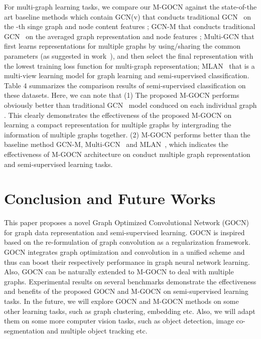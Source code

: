 \documentclass{article}
\begin{document}
For multi-graph learning tasks, we compare our M-GOCN against the state-of-the art baseline methods which contain
{GCN(v)} that conducts traditional GCN~\cite{kipf2016semi} on the -th singe graph  and node content features ;
{GCN-M} that conducts traditional GCN~\cite{kipf2016semi} on the averaged graph representation  and node features ;
{Multi-GCN} that first learns representations for multiple graphs  by using/sharing the common parameters (as suggested in work~\cite{duvenaud2015convolutional}), and then select the final representation with the lowest training loss function for multi-graph representation;
{MLAN}~\cite{nie2017multi} that is a multi-view learning model for graph learning and semi-supervised classification.
Table 4 summarizes the comparison results of semi-supervised classification on these datasets.
Here, we can note that
(1) The proposed M-GOCN performs obviously better than traditional GCN~\cite{kipf2016semi} model conduced on each individual graph . This clearly demonstrates the effectiveness of the proposed M-GOCN on learning a compact representation for multiple graphs by intergrading the information of multiple graphs together.
(2) M-GOCN performs better than the baseline method GCN-M, Multi-GCN~\cite{duvenaud2015convolutional} and {MLAN}~\cite{nie2017multi}, which indicates the effectiveness of M-GOCN architecture on conduct multiple graph representation and semi-supervised learning tasks.


\section{Conclusion and Future Works}

This paper proposes a novel Graph Optimized Convolutional Network (GOCN) for graph data representation and semi-supervised learning.
GOCN is inspired based on the re-formulation of graph convolution as a regularization framework.
GOCN integrates graph optimization and convolution in a unified scheme and thus can boost their respectively performance in graph neural network learning.
Also, GOCN can  be naturally extended to M-GOCN to deal with multiple graphs.
Experimental results on several benchmarks demonstrate
the effectiveness and benefits of the proposed GOCN and M-GOCN on semi-supervised learning tasks.
In the future, we will explore GOCN and M-GOCN methods on some other learning tasks, such as graph clustering, embedding etc.
 Also, we will adapt them on some more computer vision tasks, such as object detection, image co-segmentation and multiple object tracking etc. 

{\small


}
\end{document}
